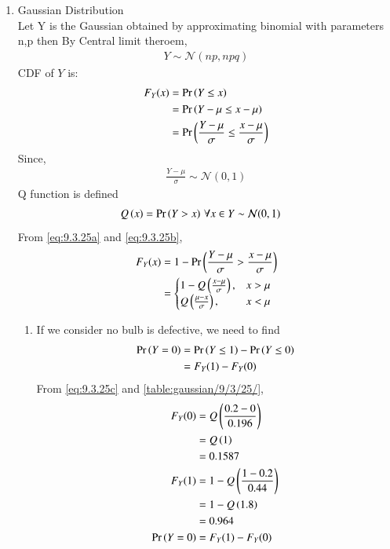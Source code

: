 \documentclass[journal,12pt,onecolumn]{IEEEtran}
\theoremstyle{remark}
\begin{document}
\begin{enumerate}[label=(\roman*)]
\item Gaussian Distribution\\
Let Y is the Gaussian obtained by approximating binomial with parameters n,p then By Central limit theroem, 
\begin{align}
	Y \sim \mathcal{N}(np,npq)
\end{align}
CDF of $Y$ is:
\begin{align}
	F_Y(x)&=\Pr\left(Y \le x\right) \\
	&=\Pr\left(Y-\mu \le x-\mu\right) \\
	&=\Pr\left(\frac{Y-\mu}{\sigma} \le \frac{x-\mu}{\sigma}\right) \label{eq:9.3.25a}
\end{align}
Since, 
\begin{align}
	\frac{Y-\mu}{\sigma} \sim \mathcal{N}(0,1)
\end{align}
Q function is defined
\begin{align}
	Q\left(x\right) &= \Pr\left(Y > x\right) \, \forall x \in Y \sim \mathcal{N}(0,1) \label{eq:9.3.25b}
\end{align}
From \eqref{eq:9.3.25a} and \eqref{eq:9.3.25b}, 
\begin{align}
	F_Y(x)&=1-\Pr\left(\frac{Y-\mu}{\sigma} > \frac{x-\mu}{\sigma}\right)\\
	&= 
    \begin{cases}
        1-Q\left( \frac{x-\mu}{\sigma}\right), &  x > \mu \\
        Q\left( \frac{\mu-x}{\sigma}\right) , &  x < \mu
    \end{cases} \label{eq:9.3.25c}
\end{align}
%
\begin{enumerate}[label=(\alph*)]
\item If we consider no bulb is defective, we need to find
\begin{align}
	\Pr\left(Y = 0\right) &= \Pr\left(Y \le 1\right) - \Pr\left(Y \le 0\right)\\
		   &= F_Y(1) - F_Y(0)
\end{align}
From \eqref{eq:9.3.25c} and \autoref{table:gaussian/9/3/25/},
\begin{align}
	F_Y(0)&=\qfunc{ \frac{0.2-0}{0.196}} \\
	&= \qfunc{1}\\
	&= 0.1587\\
	F_Y(1)&=1 -\qfunc{ \frac{1-0.2}{0.44}} \\
	&= 1 - \qfunc{1.8}\\
	&= 0.964\\
	\pr{Y = 0} &= F_Y(1) - F_Y(0)\\

\end{align}
\end{enumerate}
\end{enumerate}
\end{document}
